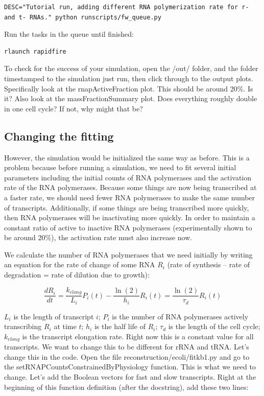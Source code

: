 \documentclass[12pt]{article}
\begin{document}
\lstset{language=bash}
\begin{lstlisting}
DESC="Tutorial run, adding different RNA polymerization rate for r- and t- RNAs." python runscripts/fw_queue.py
\end{lstlisting}

Run the tasks in the queue until finished:

\begin{lstlisting}
rlaunch rapidfire
\end{lstlisting}

To check for the success of your simulation, open the /out/ folder, and the folder timestamped to the simulation just run, then click through to the output plots. Specifically look at the rnapActiveFraction plot. This should be around 20\%. Is it? Also look at the massFractionSummary plot. Does everything roughly double in one cell cycle? If not, why might that be?

\subsection{Changing the fitting}

However, the simulation would be initialized the same way as before. This is a problem because before running a simulation, we need to fit several initial parameters including the initial counts of RNA polymerases and the activation rate of the RNA polymerases. Because some things are now being transcribed at a faster rate, we should need fewer RNA polymerases to make the same number of transcripts. Additionally, if some things are being transcribed more quickly, then RNA polymerases will be inactivating more quickly. In order to maintain a constant ratio of active to inactive RNA polymerases (experimentally shown to be around 20\%), the activation rate must also increase now. 

\par

We calculate the number of RNA polymerases that we need initially by writing an equation for the rate of change of some RNA $R_i$ (rate of synthesis – rate of degradation = rate of dilution due to growth):

$$
\frac{d R_i}{dt} = \frac{k_{elong}}{L_i}P_i(t) - \frac{\ln(2)}{h_i}R_i(t) = \frac{\ln(2)}{\tau_d}R_i(t)
$$


$L_i$ is the length of transcript $i$; $P_i$ is the number of RNA polymerases actively transcribing $R_i$ at time $t$; $h_i$ is the half life of $R_i$; $\tau_d$ is the length of the cell cycle; $k_{elong}$ is the transcript elongation rate. Right now this is a constant value for all transcripts. We want to change this to be different for rRNA and tRNA. Let’s change this in the code. Open the file reconstruction/ecoli/fitkb1.py and go to the setRNAPCountsConstrainedByPhysiology function. This is what we need to change. Let’s add the Boolean vectors for fast and slow transcripts. Right at the beginning of this function definition (after the docstring), add these two lines:
\end{document}
